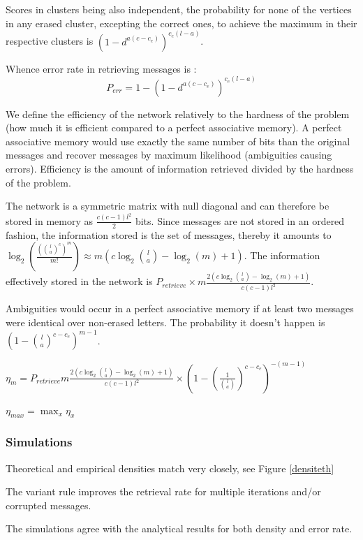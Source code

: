 \documentclass[english,11pt,twocolumn]{article}
\theoremstyle{definition}
\begin{document}
	Scores in clusters being also independent, the probability for none of the vertices in any erased cluster, excepting the correct ones, to achieve the maximum in their respective clusters is $\left(1 - d^	{a(c-c_e)}\right)^{c_e(l-a)}$.
	
	Whence error rate in retrieving messages is : \[P_{err} = 1 -	\left(1 - d^	{a(c-c_e)}\right)^{c_e(l-a)} \]
	
	We define the efficiency of the network relatively to the hardness of the problem (how much it is efficient compared to a perfect associative memory). A perfect associative memory would use exactly the same number of bits than the original messages and recover messages by maximum likelihood (ambiguities causing errors). Efficiency is the amount of information retrieved divided by the hardness of the problem.
	
	The network is a symmetric matrix with null diagonal and can therefore be stored in memory as $\frac{c(c-1) l^2}{2}$ bits. Since messages are not stored in an ordered fashion, the information stored is the set of messages, thereby it amounts to $\log_2(\frac{({l \choose a}^c)^m}{m!}) \approx m(c \log_2{l \choose a } - \log_2(m) + 1) $. The information effectively stored in the network is $P_{retrieve} \times m  \frac{2 \left(c \log_2{l \choose a } - \log_2(m) + 1 \right)}{c(c-1)l^2}$.
	
	Ambiguities would occur in a perfect associative memory if at least two messages were identical over non-erased letters. The probability it doesn't happen is $ (1-{l \choose a}^{c - c_e})^{m-1}$.
	
	
	$\eta_m = P_{retrieve} m  \frac{2 \left(c \log_2{l \choose a } - \log_2(m) + 1 \right)}{c(c-1)l^2} \times (1-(\frac{1}{{l \choose a}})^{c - c_e})^{-(m-1)}$
	
	$\eta_{max} = \max_x \eta_x $
	
	\subsubsection{Simulations}
		Theoretical and empirical densities match very closely, see Figure \ref{densiteth} %
		
		The variant rule improves the retrieval rate for multiple iterations and/or corrupted messages.
		
		The simulations agree with the analytical results for both density and error rate.
	
\end{document}
